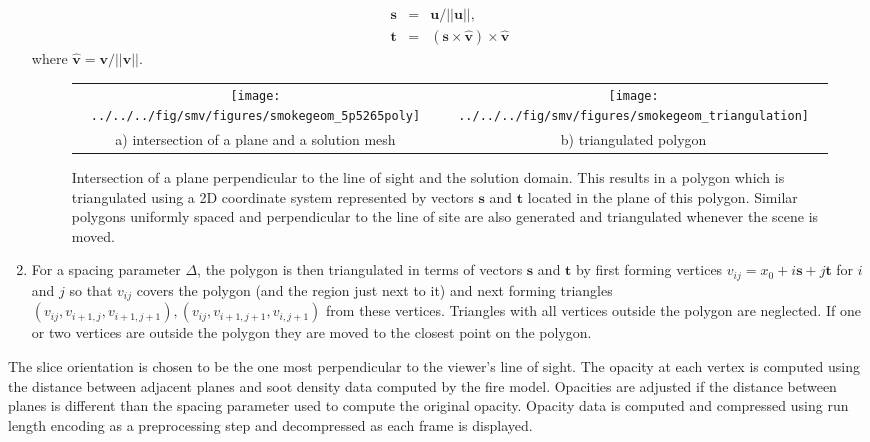\documentclass[11pt]{article}
\newcommand{\vvec}[1]{\mathbf{#1}}
\begin{document}
\begin{enumerate}
      \begin{eqnarray*}
    \vvec{s}&=&\vvec{u}/||\vvec{u}||,\\
    \vvec{t}&=&(\vvec{s} \times \vvec{\hat{v}}) \times \vvec{\hat{v}}
    \end{eqnarray*}
    where $\vvec{\hat{v}}=\vvec{v}/||\vvec{v}||$.

\begin{figure}[bph]
\begin{center}
\begin{tabular}{cc}
\texttt{[image: ../../../fig/smv/figures/smokegeom\_5p5265poly]}&
\texttt{[image: ../../../fig/smv/figures/smokegeom\_triangulation]}\\
a) intersection of a plane and a solution mesh& b) triangulated polygon
\end{tabular}
\end{center}
\caption{Intersection of a plane perpendicular to the line of sight and the solution
domain.  This results in a polygon which is triangulated
using a  2D coordinate system represented by vectors $\vvec{s}$ and $\vvec{t}$ located in the plane of this polygon.
Similar polygons uniformly spaced and perpendicular to the line of site are also generated and triangulated whenever the scene is moved.}
\label{fig:smoketriangulate}
\end{figure}

\item For a spacing parameter $\Delta$, the polygon is then triangulated in terms of vectors $\vvec{s}$ and $\vvec{t}$ by first
forming vertices $v_{ij}=x_0 + i\vvec{s} + j \vvec{t}$ for $i$ and $j$ so that $v_{ij}$ covers the polygon (and the region just next to it)
and next forming triangles $(v_{ij},v_{i+1,j},v_{i+1,j+1}), (v_{ij},v_{i+1,j+1},v_{i,j+1})$
from these vertices.
Triangles with all vertices outside the polygon are neglected.
If one or two vertices are outside the polygon they are moved to the closest point on the polygon.

\end{enumerate}

The slice orientation
is chosen to be the one most perpendicular to the viewer's line of
sight.  The opacity at each vertex is computed using the
distance between adjacent planes and soot density
data computed by the fire model.  Opacities are adjusted if the distance
between planes is different than the spacing parameter used to compute the original opacity.
Opacity data is
computed and compressed using run length encoding as a
preprocessing step and decompressed as each frame is
displayed.
\end{document}
